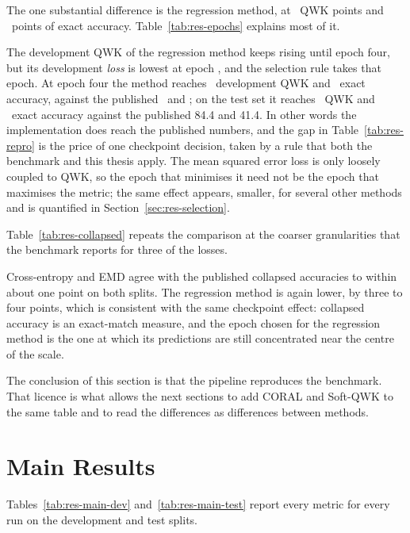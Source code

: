The one substantial difference is the regression method, at \gapQwkMSE\ QWK points and
\gapAccMSE\ points of exact accuracy. Table~\ref{tab:res-epochs} explains most of it.



The development QWK of the regression method keeps rising until epoch four, but its
development \emph{loss} is lowest at epoch \selMSE, and the selection rule takes that epoch. At
epoch four the method reaches \qwkseldevQwkMSE\ development QWK and \qwkseldevAccMSE\ exact
accuracy, against the published \paperQwkMSE\ and \paperAccMSE; on the
test set it reaches \qwkseltestQwkMSE\ QWK and \qwkseltestAccMSE\ exact accuracy against the
published 84.4 and 41.4. In other words the implementation does reach the published numbers,
and the gap in Table~\ref{tab:res-repro} is the price of one checkpoint decision, taken by a
rule that both the benchmark and this thesis apply. The mean squared error loss is only loosely
coupled to QWK, so the epoch that minimises it need not be the epoch that maximises the metric;
the same effect appears, smaller, for several other methods and is quantified in
Section~\ref{sec:res-selection}.

Table~\ref{tab:res-collapsed} repeats the comparison at the coarser granularities that the
benchmark reports for three of the losses.



Cross-entropy and EMD agree with the published collapsed accuracies to within about one point on
both splits. The regression method is again lower, by three to four points, which is consistent
with the same checkpoint effect: collapsed accuracy is an exact-match measure, and the epoch
chosen for the regression method is the one at which its predictions are still concentrated
near the centre of the scale.

The conclusion of this section is that the pipeline reproduces the benchmark. That licence is
what allows the next sections to add CORAL and Soft-QWK to the same table and to read the
differences as differences between methods.

\section{Main Results}
\label{sec:res-main}

Tables~\ref{tab:res-main-dev} and~\ref{tab:res-main-test} report every metric for every run on
the development and test splits.

